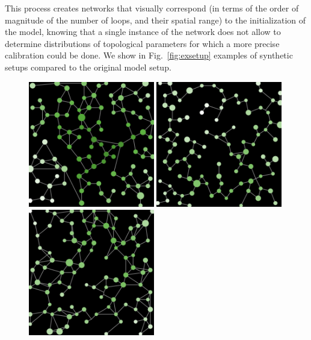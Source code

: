 This process creates networks that visually correspond (in terms of the order of magnitude of the number of loops, and their spatial range) to the initialization of the model, knowing that a single instance of the network does not allow to determine distributions of topological parameters for which a more precise calibration could be done. We show in Fig.~\ref{fig:exsetup} examples of synthetic setups compared to the original model setup.


\begin{figure}
	\centering
	\includegraphics[width=0.49\textwidth]{figures/setup_stylized.png}\hspace{0.1cm}
	\includegraphics[width=0.49\textwidth]{figures/setup_synth_0.png}\\\vspace{0.1cm}
	\includegraphics[width=0.49\textwidth]{figures/setup_synth_1.png}\hspace{0.1cm}

\end{figure}
